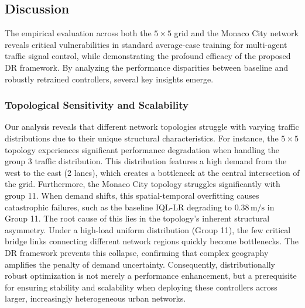 \documentclass[lettersize,journal]{IEEEtran}
\begin{document}
\subsection{Discussion}
\label{subsec:discussion}

The empirical evaluation across both the $5\times5$ grid and the Monaco City network reveals critical vulnerabilities in standard average-case training for multi-agent traffic signal control, while demonstrating the profound efficacy of the proposed DR framework. By analyzing the performance disparities between baseline and robustly retrained controllers, several key insights emerge.

\subsubsection{Topological Sensitivity and Scalability}
Our analysis reveals that different network topologies struggle with varying traffic distributions due to their unique structural characteristics. For instance, the $5\times5$ topology experiences significant performance degradation when handling the group 3 traffic distribution. This distribution features a high demand from the west to the east (2 lanes), which creates a bottleneck at the central intersection of the grid. Furthermore, the Monaco City topology struggles significantly with group 11. When demand shifts, this spatial-temporal overfitting causes catastrophic failures, such as the baseline IQL-LR degrading to $0.38\,\mathrm{m/s}$ in Group 11. The root cause of this lies in the topology's inherent structural asymmetry. Under a high-load uniform distribution (Group 11), the few critical bridge links connecting different network regions quickly become bottlenecks. The DR framework prevents this collapse, confirming that complex geography amplifies the penalty of demand uncertainty. Consequently, distributionally robust optimization is not merely a performance enhancement, but a prerequisite for ensuring stability and scalability when deploying these controllers across larger, increasingly heterogeneous urban networks.
\end{document}
